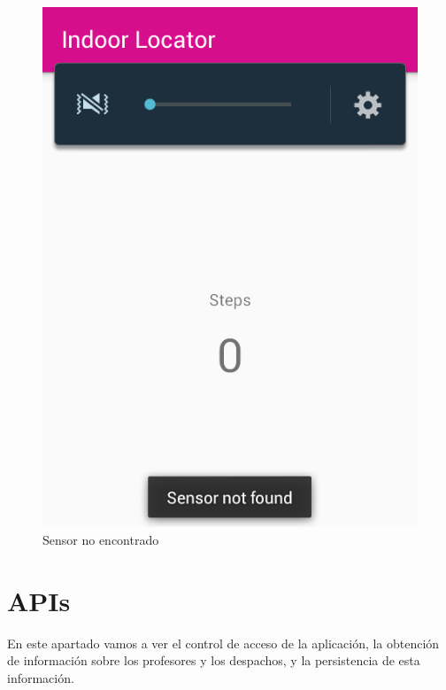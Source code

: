 \documentclass[12pt, a4paper, titlepage]{article}
\begin{document}
        		\begin{figure}[h!]
        			\begin{center}
        				\includegraphics[scale=0.45]{img/notFound.png}
        				\caption{Sensor no encontrado}
        			\end{center}
        		\end{figure}
	\clearpage

	\section{APIs}
	En este apartado vamos a ver el control de acceso de la aplicación, la obtención de información sobre los profesores y los despachos, y la persistencia de esta información.
	
\end{document}
